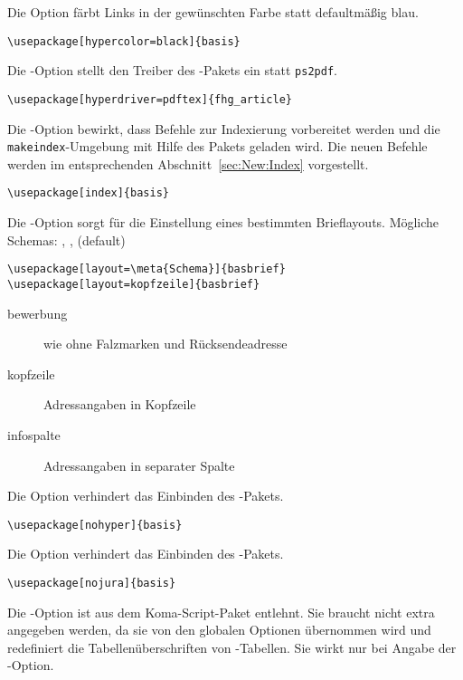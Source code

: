 Die Option  färbt Links in der gewünschten Farbe statt defaultmäßig blau.

\verb#\usepackage[hypercolor=black]{basis}#


Die -Option stellt den Treiber des -Pakets ein statt \verb#ps2pdf#.

\verb#\usepackage[hyperdriver=pdftex]{fhg_article}#


Die -Option bewirkt, dass Befehle zur Indexierung vorbereitet
werden und die \verb#makeindex#-Umgebung mit Hilfe des Pakets 
geladen wird.
Die neuen Befehle werden im entsprechenden Abschnitt~\ref{sec:New:Index} vorgestellt.

\verb#\usepackage[index]{basis}#


Die -Option sorgt für die Einstellung eines bestimmten Brieflayouts.
Mögliche Schemas: , ,  (default)

\verb#\usepackage[layout=\meta{Schema}]{basbrief}#\\
\verb#\usepackage[layout=kopfzeile]{basbrief}#

\begin{description}
		\item [bewerbung] wie  ohne Falzmarken und Rücksendeadresse
		\item [kopfzeile] Adressangaben in Kopfzeile
		\item [infospalte] Adressangaben in separater Spalte
\end{description}


Die Option  verhindert das Einbinden des -Pakets.

\verb#\usepackage[nohyper]{basis}#


Die Option  verhindert das Einbinden des -Pakets.

\verb#\usepackage[nojura]{basis}#


Die -Option ist aus dem Koma-Script-Paket entlehnt.
Sie braucht nicht extra angegeben werden, da sie von den globalen Optionen übernommen wird und redefiniert die Tabellenüberschriften von -Tabellen.
Sie wirkt nur bei Angabe der -Option.

